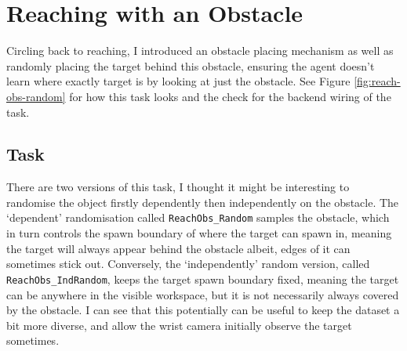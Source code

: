 \section{Reaching with an Obstacle}\label{sec:reach-obs}
Circling back to reaching, I introduced an obstacle placing mechanism as well as randomly placing the target behind this obstacle, ensuring the agent doesn't learn where exactly target is by looking at just the obstacle\todo[color=purple]. See Figure \ref{fig:reach-obs-random} for how this task looks and the check  for the backend wiring of the task.

\subsection{Task}\label{subsec:ro-creating-the-task}
There are two versions of this task, I thought it might be interesting to randomise the object firstly dependently then independently on the obstacle. The `dependent' randomisation called \verb|ReachObs_Random| samples the obstacle, which in turn controls the spawn boundary of where the target can spawn in, meaning the target will always appear behind the obstacle albeit, edges of it can sometimes stick out. Conversely, the `independently' random version, called \verb|ReachObs_IndRandom|, keeps the target spawn boundary fixed, meaning the target can be anywhere in the visible workspace, but it is not necessarily always covered by the obstacle. I can see that this potentially can be useful to keep the dataset a bit more diverse, and allow the wrist camera initially observe the target sometimes.


